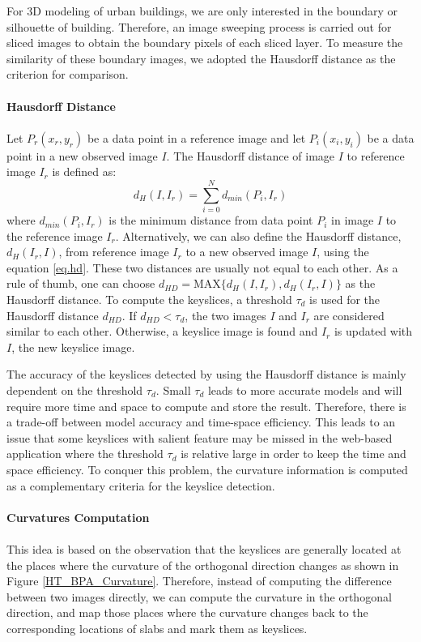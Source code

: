 \documentclass[12pt,letterpaper]{article}
\begin{document}
For 3D modeling of urban buildings, we are only interested in the boundary or silhouette of building.
Therefore, an image sweeping process is carried out for sliced images to obtain the boundary pixels
of each sliced layer. To measure the similarity of these boundary images, we adopted the Hausdorff
distance as the criterion for comparison.
\\
\\
\textbf{Hausdorff Distance}
\\
\\
Let $P_r(x_r, y_r)$ be a data point in a reference image and
let $P_i(x_i, y_i)$ be a data point in a new observed image $I$.
The Hausdorff distance of image $I$ to reference image $I_r$ is defined as:
\begin{equation} \label{eq.hd}
d_H(I, I_r) = \sum_{i=0}^Nd_{min}(P_i, I_r)
\end{equation}
where $d_{min}(P_i, I_r)$ is the minimum distance from data point $P_i$
in image $I$ to the reference image $I_r$.
Alternatively, we can also define the Hausdorff distance, $d_H(I_r, I)$,
from reference image $I_r$ to a new observed image $I$, using the equation \ref{eq.hd}.
These two distances are usually not equal to each other.
As a rule of thumb, one can choose
$d_{HD} = \text{MAX}\{d_H(I, I_r), d_H(I_r, I)\}$ as the Hausdorff distance.
To compute the keyslices, a threshold $\tau_{d}$ is used for the
Hausdorff distance $d_{HD}$.
If $d_{HD} < \tau_{d}$, the two images $I$ and $I_r$ are considered
similar to each other.
Otherwise, a keyslice image is found and $I_r$ is updated with $I$,
the new keyslice image.

The accuracy of the keyslices detected by using the Hausdorff distance
is mainly dependent on the threshold $\tau_d$.
Small $\tau_d$ leads to more accurate models and will require more time and
space to compute and store the result.
Therefore, there is a trade-off between model accuracy and time-space
efficiency.
This leads to an issue that some keyslices with salient feature may be missed in the web-based application where
the threshold $\tau_d$ is relative large in order to keep the time and space efficiency.
To conquer this problem, the curvature information is computed as a complementary
criteria for the keyslice detection.
\\
\\
\textbf{Curvatures Computation}
\\
\\
This idea is based on the observation that the keyslices are generally located at
the places where the curvature of the orthogonal direction changes as shown in Figure
\ref{HT_BPA_Curvature}. Therefore,
instead of computing the difference between two images directly, we can compute the
curvature in the orthogonal direction, and map those places where the curvature changes
back to the corresponding locations of slabs and mark them as keyslices.
\end{document}
